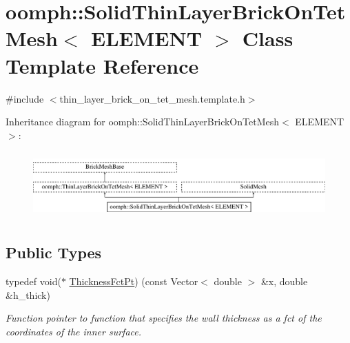 \hypertarget{classoomph_1_1SolidThinLayerBrickOnTetMesh}{}\section{oomph\+:\+:Solid\+Thin\+Layer\+Brick\+On\+Tet\+Mesh$<$ E\+L\+E\+M\+E\+NT $>$ Class Template Reference}
\label{classoomph_1_1SolidThinLayerBrickOnTetMesh}


{\ttfamily \#include $<$thin\+\_\+layer\+\_\+brick\+\_\+on\+\_\+tet\+\_\+mesh.\+template.\+h$>$}

Inheritance diagram for oomph\+:\+:Solid\+Thin\+Layer\+Brick\+On\+Tet\+Mesh$<$ E\+L\+E\+M\+E\+NT $>$\+:\begin{figure}[H]
\begin{center}
\leavevmode
\includegraphics[height=2.592592cm]{classoomph_1_1SolidThinLayerBrickOnTetMesh}
\end{center}
\end{figure}
\subsection*{Public Types}
\begin{DoxyCompactItemize}
\item 
typedef void($\ast$ \hyperlink{classoomph_1_1SolidThinLayerBrickOnTetMesh_ae4289650b0c0eccb2fd3d661b85e85ee}{Thickness\+Fct\+Pt}) (const Vector$<$ double $>$ \&x, double \&h\+\_\+thick)
\begin{DoxyCompactList}\small\item\em Function pointer to function that specifies the wall thickness as a fct of the coordinates of the inner surface. \end{DoxyCompactList}\end{DoxyCompactItemize}
